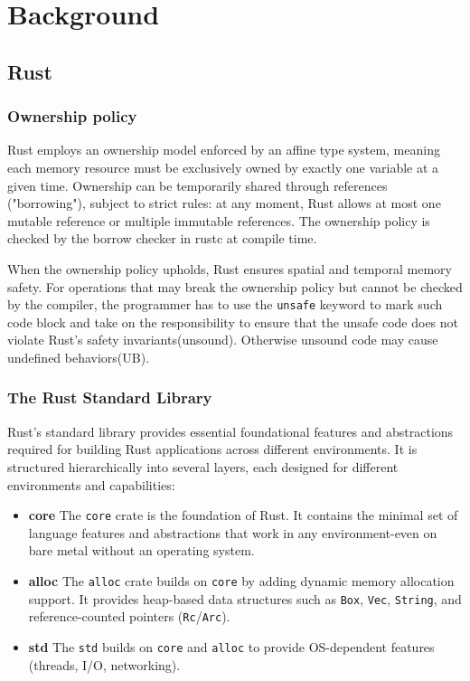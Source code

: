 \documentclass[conference]{IEEEtran}
\begin{document}


\section{Background}

\subsection{Rust}
\subsubsection{Ownership policy}
Rust employs an ownership model enforced by an affine type system, meaning each memory resource must be exclusively owned by exactly one variable at a given time. Ownership can be temporarily shared through references ("borrowing"), subject to strict rules: at any moment, Rust allows at most one mutable reference or multiple immutable references. The ownership policy is checked by the borrow checker in rustc at compile time.

When the ownership policy upholds, Rust ensures spatial and temporal memory safety. For operations that may break the ownership policy but cannot be checked by the compiler, the programmer has to use the \texttt{unsafe} keyword to mark such code block and take on the responsibility to ensure that the unsafe code does not violate Rust's safety invariants(unsound). Otherwise unsound code may cause undefined behaviors(UB).

\subsubsection{The Rust Standard Library}
Rust's standard library provides essential foundational features and abstractions required for building Rust applications across different environments. It is structured hierarchically into several layers, each designed for different environments and capabilities:
\begin{itemize}
        \item \textbf{core} The \texttt{core} crate is the foundation of Rust. It contains the minimal set of language features and abstractions that work in any environment-even on bare metal without an operating system.
        \item \textbf{alloc} The \texttt{alloc} crate builds on \texttt{core} by adding dynamic memory allocation support. It provides heap-based data structures such as \texttt{Box}, \texttt{Vec}, \texttt{String}, and reference-counted pointers (\texttt{Rc}/\texttt{Arc}).
        \item \textbf{std} The \texttt{std} builds on \texttt{core} and \texttt{alloc} to provide OS-dependent features (threads, I/O, networking).
\end{itemize}
\end{document}
